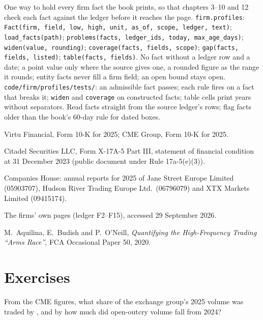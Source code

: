 \begin{build}
 One way to hold every firm fact the book prints, so that chapters 3--10 and 12 check each fact against
the ledger before it reaches the page.
 \texttt{firm.profiles}: \texttt{Fact(firm, field, low, high, unit, as\_of, scope, ledger, text)};
\texttt{load\_facts(path)}; \texttt{problems(facts, ledger\_ids, today, max\_age\_days)}; \texttt{widen(value,
rounding)}; \texttt{coverage(facts, fields, scope)}; \texttt{gap(facts, fields, listed)}; \texttt{table(facts, fields)}.
 No fact without a ledger row and a date; a point value only where the source gives one, a rounded figure
as the range it rounds; entity facts never fill a firm field; an open bound stays open.
 \texttt{code/firm/profiles/tests/}: an admissible fact passes; each rule fires on a fact that
breaks it; \texttt{widen} and \texttt{coverage} on constructed facts; table cells print years without separators.
 Read facts straight from the source ledger's rows; flag facts older than the book's 60-day rule for
dated boxes.
\end{build}

\begin{omsources}
\item Virtu Financial, Form 10-K for 2025; CME Group, Form 10-K for 2025.
\item Citadel Securities LLC, Form X-17A-5 Part III, statement of financial condition at 31 December 2023 (public
document under Rule 17a-5(e)(3)).
\item Companies House: annual reports for 2025 of Jane Street Europe Limited (05903707), Hudson River Trading Europe
Ltd.\ (06796079) and XTX Markets Limited (09415174).
\item The firms' own pages (ledger F2--F15), accessed 29 September 2026.
\item M.~Aquilina, E.~Budish and P.~O'Neill, \emph{Quantifying the High-Frequency Trading ``Arms Race''}, FCA Occasional
Paper 50, 2020.
\end{omsources}

\section{Exercises}

\begin{exercise}[$\star$]\label{exo:in:proprietary-market-makers-and-high-frequency-firms:1}
From the CME figures, what share of the exchange group's 2025 volume was traded by , and by how much did
open-outcry volume fall from 2024?
\end{exercise}

